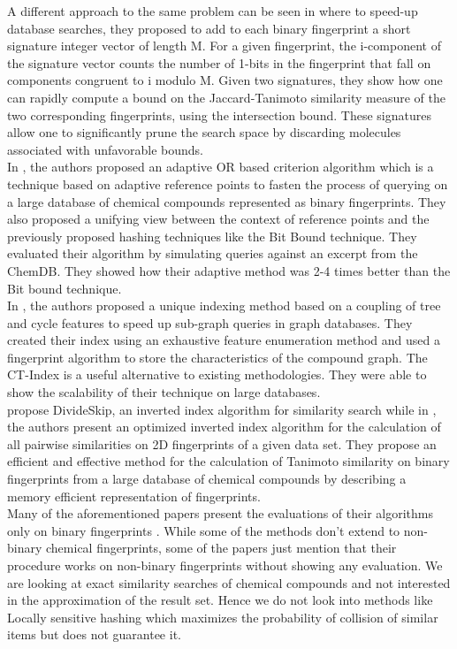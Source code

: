 A different approach to the same problem can be seen in \citet*{nasr2010hashing} where to speed-up database searches, they proposed to add to each binary fingerprint a short signature integer vector of length M. For a given fingerprint, the i-component of the signature vector counts the number of 1-bits in the fingerprint that fall on components congruent to i modulo M. Given two signatures, they show how one can rapidly compute a bound on the Jaccard-Tanimoto similarity measure of the two corresponding fingerprints, using the intersection bound. These signatures allow one to significantly prune the search space by discarding molecules associated with unfavorable bounds. \\

In \citet*{napolitano2014adaptive}, the authors proposed an adaptive OR based criterion algorithm which is a technique based on adaptive reference points to fasten the process of querying on a large database of chemical compounds represented as binary fingerprints. They also proposed a unifying view between the
context of reference points and the previously proposed hashing techniques like the Bit Bound technique. They evaluated their algorithm by simulating queries against an excerpt from the ChemDB. They showed how their adaptive method was 2-4 times better than the Bit bound technique.  \\

In \citet*{klein2011ct}, the authors proposed a unique indexing method based on a coupling of tree and cycle features to speed up sub-graph queries in graph databases. They created their index using an exhaustive feature enumeration method and used a fingerprint algorithm to store the characteristics of the compound graph. The CT-Index is a useful alternative to existing methodologies. They were able to show the scalability of their technique on large databases. \\

\citet*{nasr2012speeding} propose DivideSkip, an inverted index algorithm for similarity search while in \citet*{thiel2014blocked}, the authors present an optimized inverted index algorithm for the calculation of all pairwise similarities on 2D fingerprints of a given data set. They propose an efficient and effective method for the calculation of Tanimoto similarity on binary fingerprints from a large database of chemical compounds by describing a memory efficient representation of fingerprints.\\

Many of the aforementioned papers present the evaluations of their algorithms only on binary fingerprints . While some of the methods don't extend to non-binary chemical fingerprints, some of the papers just mention that their procedure works on non-binary fingerprints without showing any evaluation. We are looking at exact similarity searches of chemical compounds and not interested in the approximation of the result set. Hence we do not look into methods like Locally sensitive hashing which maximizes the probability of collision of similar items but does not guarantee it. 
